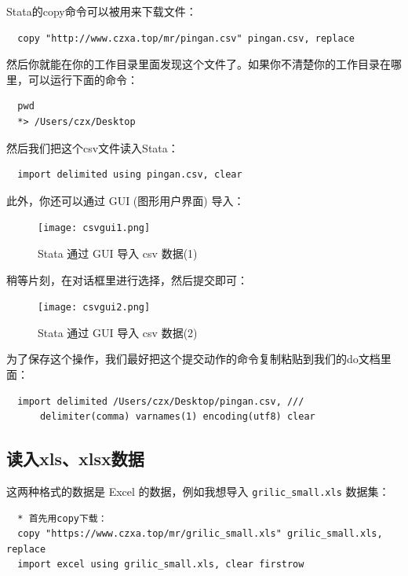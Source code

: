 \documentclass[cn,fancy,blue,11pt]{elegantbook}
\begin{document}
Stata的copy命令可以被用来下载文件：

\begin{lstlisting}
  copy "http://www.czxa.top/mr/pingan.csv" pingan.csv, replace
\end{lstlisting}

然后你就能在你的工作目录里面发现这个文件了。如果你不清楚你的工作目录在哪里，可以运行下面的命令：

\begin{lstlisting}
  pwd
  *> /Users/czx/Desktop
\end{lstlisting}

然后我们把这个csv文件读入Stata：

\begin{lstlisting}
  import delimited using pingan.csv, clear
\end{lstlisting}

此外，你还可以通过 GUI (图形用户界面) 导入：

\begin{figure}[htbp]
  \centering \texttt{[image: csvgui1.png]}
  \caption{Stata 通过 GUI 导入 csv 数据(1)}
  \label{fig:csvgui1}
\end{figure}

稍等片刻，在对话框里进行选择，然后提交即可：

\begin{figure}[htbp]
  \centering \texttt{[image: csvgui2.png]}
  \caption{Stata 通过 GUI 导入 csv 数据(2)}
  \label{fig:csvgui2}
\end{figure}

为了保存这个操作，我们最好把这个提交动作的命令复制粘贴到我们的do文档里面：

\begin{lstlisting}
  import delimited /Users/czx/Desktop/pingan.csv, ///
      delimiter(comma) varnames(1) encoding(utf8) clear
\end{lstlisting}

\subsection{读入xls、xlsx数据}

这两种格式的数据是 Excel 的数据，例如我想导入 \texttt{grilic\_small.xls} 数据集：

\begin{lstlisting}
  * 首先用copy下载：
  copy "https://www.czxa.top/mr/grilic_small.xls" grilic_small.xls, replace
  import excel using grilic_small.xls, clear firstrow
\end{lstlisting}
\end{document}
